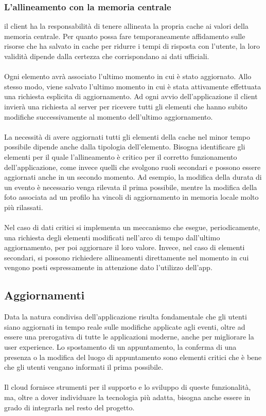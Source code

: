 \subsubsection{L'allineamento con la memoria centrale}

il client ha la responsabilità di tenere allineata la propria cache ai valori della memoria centrale. 
Per quanto possa fare temporaneamente affidamento sulle risorse che ha salvato in cache per ridurre i tempi di risposta con l’utente, 
la loro validità dipende dalla certezza che corrispondano ai dati ufficiali. \\
\\

Ogni elemento avrà associato l’ultimo momento in cui è stato aggiornato. 
Allo stesso modo, viene salvato l’ultimo momento in cui è stata attivamente effettuata una richiesta esplicita di aggiornamento.  
Ad ogni avvio dell’applicazione il client invierà una richiesta al server per ricevere tutti gli elementi che hanno subito modifiche successivamente al momento dell’ultimo aggiornamento.\\
\\
La necessità di avere aggiornati tutti gli elementi della cache nel minor tempo possibile dipende anche dalla tipologia dell’elemento. 
Bisogna identificare gli elementi per il quale l’allineamento è critico per il corretto funzionamento dell’applicazione, 
come invece quelli che svolgono ruoli secondari e possono essere aggiornati anche in un secondo momento. 
Ad esempio, la modifica della durata di un evento è necessario venga rilevata il prima possibile, 
mentre la modifica della foto associata ad un profilo ha vincoli di aggiornamento in memoria locale molto più rilassati.\\
\\
Nel caso di dati critici si implementa un meccanismo che esegue, periodicamente, una richiesta degli elementi modificati nell’arco di tempo dall’ultimo aggiornamento, 
per poi aggiornare il loro valore. Invece, nel caso di elementi secondari, 
si possono richiedere allineamenti direttamente nel momento in cui vengono posti espressamente in attenzione dato l’utilizzo dell’app.

\clearpage
\subsection{Aggiornamenti}

Data la natura condivisa dell’applicazione risulta fondamentale che gli utenti siano aggiornati in tempo reale sulle modifiche applicate agli eventi, 
oltre ad essere una prerogativa di tutte le applicazioni moderne, anche per migliorare la user experience. 
Lo spostamento di un appuntamento, la conferma di una presenza o la modifica del luogo di appuntamento sono elementi critici che è bene che gli utenti vengano informati il prima possibile. \\
\\
Il cloud fornisce strumenti per il supporto e lo sviluppo di queste funzionalità, ma, oltre a dover individuare la tecnologia più adatta, bisogna anche essere in grado di integrarla nel resto del progetto.\\
\\
